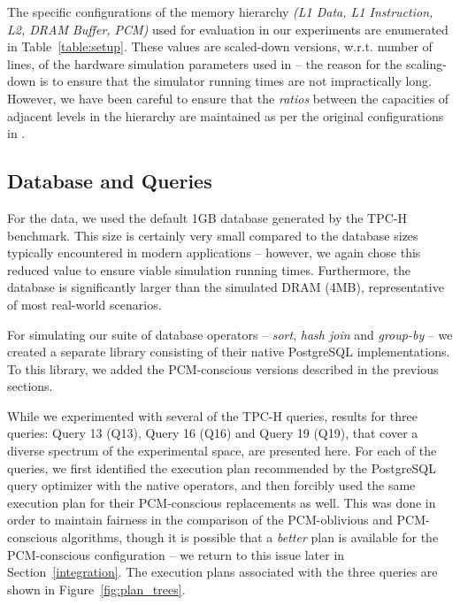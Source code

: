 The specific configurations of the memory hierarchy \emph{(L1 Data,
L1 Instruction, L2, DRAM Buffer, PCM)} used for evaluation in our experiments are
enumerated in Table~\ref{table:setup}.  These values are scaled-down
versions, w.r.t. number of lines, of the hardware simulation parameters used
in \cite{wear} -- the reason for the scaling-down is to ensure that the
simulator running times are not impractically long. However, we have been
careful to ensure that the \emph{ratios} between the capacities of adjacent
levels in the hierarchy are maintained as per the original configurations
in \cite{wear}.  


\subsection{Database and Queries}
For the data, we used the default 1GB database generated by the
TPC-H \cite{tpch} benchmark.  This size is certainly very small compared to the
database sizes typically encountered in modern applications -- however,
we again chose this reduced value to ensure viable simulation running
times. Furthermore, the database is significantly larger than the
simulated DRAM (4MB), representative of most real-world
scenarios.

For simulating our suite of database operators -- \textit{sort},
\textit{hash join} and \textit{group-by} -- we created a separate library
consisting of their native PostgreSQL \cite{postgres} implementations. To
this library, we added the PCM-conscious versions described in the
previous sections.

While we experimented with several of the TPC-H queries, results for
three queries: {\sf Query 13 (Q13)}, {\sf Query 16 (Q16)} and {\sf Query 19 (Q19)}, that
cover a diverse spectrum of the experimental space, are presented here.
For each of the queries, we first identified the execution plan
recommended by the PostgreSQL query optimizer with the native operators,
and then forcibly used the same execution plan for their PCM-conscious
replacements as well. This was done in order to maintain fairness in the
comparison of the PCM-oblivious and PCM-conscious algorithms, though it
is possible that a \emph{better} plan is available for the PCM-conscious
configuration -- we return to this issue 
later in Section~\ref{integration}.  The execution plans associated with the
three queries are shown in Figure~\ref{fig:plan_trees}. 
 


